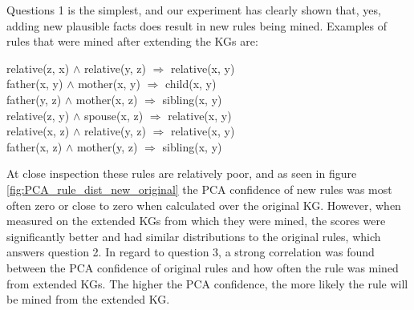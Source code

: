 Questions 1 is the simplest, and our experiment has clearly shown that, yes, adding new plausible facts does result in new rules being mined. Examples of rules that were mined after extending the KGs are:
                            \begin{center}
                            relative(z, x) $\wedge$ relative(y, z) $\Rightarrow$ relative(x, y) \\
                          father(x, y) $\wedge$ mother(x, y) $\Rightarrow$ child(x, y) \\
                            father(y, z) $\wedge$ mother(x, z) $\Rightarrow$ sibling(x, y) \\
                            relative(z, y) $\wedge$ spouse(x, z) $\Rightarrow$ relative(x, y) \\
                             relative(x, z) $\wedge$ relative(y, z) $\Rightarrow$ relative(x, y) \\
                            father(x, z) $\wedge$ mother(y, z) $\Rightarrow$ sibling(x, y) \\
                             \end{center}
At close inspection these rules are relatively poor, and as seen in figure \ref{fig:PCA_rule_dist_new_original} the PCA confidence of new rules was most often zero or close to zero when calculated over the original KG. However, when measured on the extended KGs from which they were mined, the scores were significantly better and had similar distributions to the original rules, which answers question 2. In regard to question 3, a strong correlation was found between the PCA confidence of original rules and how often the rule was mined from extended KGs. The higher the PCA confidence, the more likely the rule will be mined from the extended KG.



